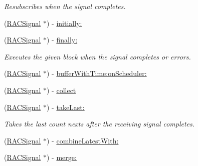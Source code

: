 \begin{DoxyCompactItemize}
\begin{DoxyCompactList}\small\item\em Resubscribes when the signal completes. \end{DoxyCompactList}\item 
(\mbox{\hyperlink{interface_r_a_c_signal}{R\+A\+C\+Signal}} $\ast$) -\/ \mbox{\hyperlink{category_r_a_c_signal_07_operations_08_a2c8566a5d3b5997357d34ee5991a2e0c}{initially\+:}}
\item 
\mbox{\label{category_r_a_c_signal_07_operations_08_ae07531acf550fb75812c77adfffc0bb7}} 
(\mbox{\hyperlink{interface_r_a_c_signal}{R\+A\+C\+Signal}} $\ast$) -\/ \mbox{\hyperlink{category_r_a_c_signal_07_operations_08_ae07531acf550fb75812c77adfffc0bb7}{finally\+:}}
\begin{DoxyCompactList}\small\item\em Executes the given block when the signal completes or errors. \end{DoxyCompactList}\item 
(\mbox{\hyperlink{interface_r_a_c_signal}{R\+A\+C\+Signal}} $\ast$) -\/ \mbox{\hyperlink{category_r_a_c_signal_07_operations_08_a7f0cb2086a2123f40552d2eab2a9cc54}{buffer\+With\+Time\+:on\+Scheduler\+:}}
\item 
(\mbox{\hyperlink{interface_r_a_c_signal}{R\+A\+C\+Signal}} $\ast$) -\/ \mbox{\hyperlink{category_r_a_c_signal_07_operations_08_a70b8f976dc0ece9b82e47cdb346a3a09}{collect}}
\item 
\mbox{\label{category_r_a_c_signal_07_operations_08_a0f359e9261777b7999c7229c105211ee}} 
(\mbox{\hyperlink{interface_r_a_c_signal}{R\+A\+C\+Signal}} $\ast$) -\/ \mbox{\hyperlink{category_r_a_c_signal_07_operations_08_a0f359e9261777b7999c7229c105211ee}{take\+Last\+:}}
\begin{DoxyCompactList}\small\item\em Takes the last {\ttfamily count} {\ttfamily next}s after the receiving signal completes. \end{DoxyCompactList}\item 
(\mbox{\hyperlink{interface_r_a_c_signal}{R\+A\+C\+Signal}} $\ast$) -\/ \mbox{\hyperlink{category_r_a_c_signal_07_operations_08_afab1b19558df566351cf87e466a5022f}{combine\+Latest\+With\+:}}
\item 
(\mbox{\hyperlink{interface_r_a_c_signal}{R\+A\+C\+Signal}} $\ast$) -\/ \mbox{\hyperlink{category_r_a_c_signal_07_operations_08_aeda66daaf146a2d218ba7819297628a9}{merge\+:}}

\end{DoxyCompactItemize}
